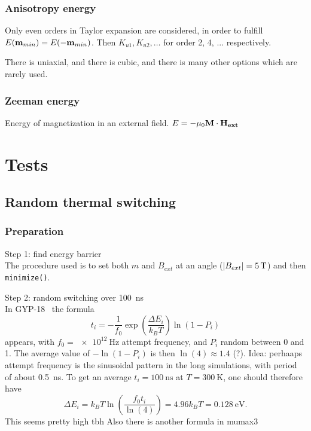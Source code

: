 \documentclass[10pt,a4paper]{article}
\newcommand{\code}[1]{\texttt{#1}}
\begin{document}
	\subsubsection{Anisotropy energy}
	Only even orders in Taylor expansion are considered, in order to fulfill $E(\vb{m}_{min}) = E(-\vb{m}_{min})$. Then $K_{u1}, K_{u2}, \dots$ for order 2, 4, ... respectively.
	
	There is uniaxial, and there is cubic, and there is many other options which are rarely used.
	
	\subsubsection{Zeeman energy}
	Energy of magnetization in an external field.
	$E = -\mu_0 \vb{M} \cdot \vb{H_{ext}}$
	
	\section{Tests}
	\subsection{Random thermal switching}
	\subsubsection{Preparation}
	Step 1: find energy barrier \\
	The procedure used is to set both $m$ and $B_{ext}$ at an angle ($\abs{B_{ext}} = \SI{5}{\tesla}$) and then \code{minimize()}.
	
	Step 2: random switching over \SI{100}{\nano\second} \\
	In GYP-18~\cite{GYP-18} the formula
	\begin{equation}
	    t_i = -\frac{1}{f_0} \exp(\frac{\Delta E_i}{k_B T}) \ln(1-P_i)
	\end{equation}
	appears, with $f_0 = \SI{e12}{\hertz}$ attempt frequency, and $P_i$ random between 0 and 1. The average value of $-\ln(1-P_i)$ is then $\ln(4) \approx 1.4$ (?).
	Idea: perhaaps attempt frequency is the sinusoidal pattern in the long simulations, with period of about \SI{0.5}{\nano\second}.
	To get an average $t_i = \SI{100}{\nano\second}$ at $T=\SI{300}{\kelvin}$, one should therefore have
	\begin{equation}
	    \Delta E_i = k_B T \ln(\frac{f_0 t_i}{\ln(4)}) = 4.96 k_B T = \SI{0.128}{\electronvolt} \mathrm{.}
	\end{equation}
	This seems pretty high tbh
	Also there is another formula in mumax3~\cite{MuMax3}
	
\end{document}
